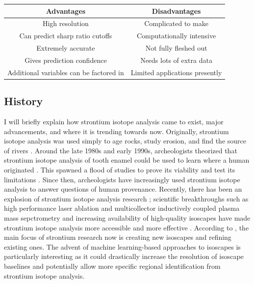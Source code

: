 \documentclass[a4paper, 12pt]{article}
\begin{document}
\begin{center}
    \begin{tabular}{||c | c||}
        \hline
        Advantages                              & Disadvantages                  \\ [0.5ex]
        \hline\hline
        High resolution                         & Complicated to make            \\
        \hline
        Can predict sharp ratio cutoffs         & Computationally intensive      \\
        \hline
        Extremely accurate                      & Not fully fleshed out          \\
        \hline
        Gives prediction confidence             & Needs lots of extra data       \\
        \hline
        Additional variables can be factored in & Limited applications presently \\[1ex]
        \hline
    \end{tabular}
\end{center}


\subsection{History}
I will briefly explain how strontium isotope analysis came to exist, major advancements,
and where it is trending towards now. Originally, strontium isotope analysis was used simply to age rocks, study erosion, and
find the source of rivers \citep*{moorbath1965, crowley2017}. Around the late 1980s and early 1990s, archeologists theorized
that strontium isotope analysis of tooth enamel could be used to learn where a human originated \citep{crowley2017}. This spawned
a flood of studies to prove its viability and test its limitations \citep{crowley2017}.
Since then, archeologists have increasingly used strontium isotope analysis to answer
questions of human provenance. Recently, there has been an explosion of strontium
isotope analysis research \citep{crowley2017}; scientific
breakthroughs such as high performance laser ablation and multicollector inductively coupled
plasma mass sepctrometry and increasing availability of high-quality isoscapes \citep{crowley2017}
have made strontium isotope analysis more accessible and more effective \citep{holt2021}.
According to \cite{holt2021}, the main focus of strontium research now is creating new isoscapes
and refining existing ones. The advent of machine learning-based approaches to isoscapes
is particularly interesting as it could drastically increase the resolution of isoscape
baselines and potentially allow more specific regional identification from strontium
isotope analysis.
\end{document}
